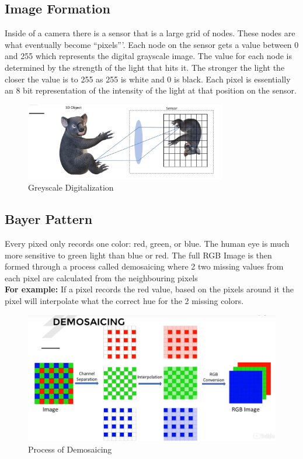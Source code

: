 \documentclass[fleqn]{article}
\begin{document}

    \subsection{Image Formation}
    Inside of a camera there is a sensor that is a large grid of nodes. These nodes are what eventually become ``pixels'''. Each node on the sensor gets a value between 0 and 255 which represents the digital grayscale image. The value for each node is determined by the strength of the light that hits it. The stronger the light the closer the value is to 255 as 255 is white and 0 is black. Each pixel is essentially an 8 bit representation of the intensity of the light at that position on the sensor.

    \begin{figure}[h!]
      \centering
      \includegraphics[width=250pt]{koala.png}
      \caption{Greyscale Digitalization }
      \label{fig: Greyscale Representation of an Image}
    \end{figure}



    \newpage
    \clearpage
    \subsection{Bayer Pattern}
    Every pixed only records one color: red, green, or blue. The human eye is much more sensitive to green light than blue or red. The full RGB Image is then formed through a process called demosaicing where 2 two missing values from each pixel are calculated from the neighbouring pixels\\
    \textbf{For example:} If a pixel records the red value, based on the pixels around it the pixel will interpolate what the correct hue for the 2 missing colors.

    \begin{figure}[h!]
      \centering
      \includegraphics[width=550pt]{demosaicing.png}
      \caption{Process of Demosaicing}
      \label{fig: How the total RGB Image is found through demosaicing}
    \end{figure}
\end{document}
